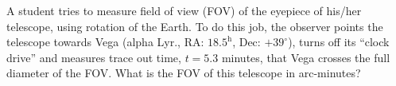 A student tries to measure field of view (FOV) of the eyepiece of his/her
telescope, using rotation of the Earth. To do this job, the observer points the
telescope towards Vega (alpha Lyr., RA: $18.5^{\mathrm{h}}$, Dec: $+39^\circ$),
turns off its ``clock drive'' and measures trace out time, $t = 5.3$ minutes,
that Vega crosses the full diameter of the FOV. What is the FOV of this
telescope in arc-minutes?
